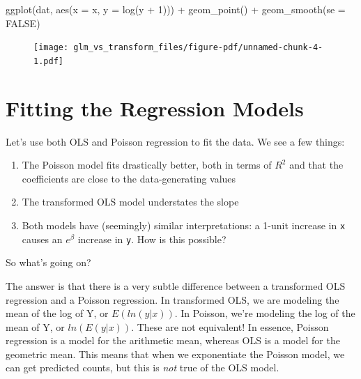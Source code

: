 \documentclass[
  letterpaper,
  DIV=11,
  numbers=noendperiod]{scrreprt}
\newenvironment{Shaded}{\begin{snugshade}}{\end{snugshade}}
\newcommand{\AttributeTok}[1]{\textcolor[rgb]{0.49,0.56,0.16}{#1}}
\newcommand{\ConstantTok}[1]{\textcolor[rgb]{0.53,0.00,0.00}{#1}}
\newcommand{\DecValTok}[1]{\textcolor[rgb]{0.25,0.63,0.44}{#1}}
\newcommand{\FunctionTok}[1]{\textcolor[rgb]{0.02,0.16,0.49}{#1}}
\newcommand{\NormalTok}[1]{\textcolor[rgb]{0.00,0.44,0.13}{#1}}
\newcommand{\SpecialCharTok}[1]{\textcolor[rgb]{0.25,0.44,0.63}{#1}}
\providecommand{\tightlist}{%
  \setlength{\itemsep}{0pt}\setlength{\parskip}{0pt}}\usepackage{longtable,booktabs,array}
\begin{document}
\begin{Shaded}
\begin{Highlighting}[]
\FunctionTok{ggplot}\NormalTok{(dat, }\FunctionTok{aes}\NormalTok{(}\AttributeTok{x =}\NormalTok{ x, }\AttributeTok{y =} \FunctionTok{log}\NormalTok{(y }\SpecialCharTok{+} \DecValTok{1}\NormalTok{))) }\SpecialCharTok{+}
  \FunctionTok{geom\_point}\NormalTok{() }\SpecialCharTok{+}
  \FunctionTok{geom\_smooth}\NormalTok{(}\AttributeTok{se =} \ConstantTok{FALSE}\NormalTok{)}
\end{Highlighting}
\end{Shaded}

\begin{figure}[H]

{\centering \texttt{[image: glm\_vs\_transform\_files/figure-pdf/unnamed-chunk-4-1.pdf]}

}

\end{figure}

\hypertarget{fitting-the-regression-models}{%
\section{Fitting the Regression
Models}\label{fitting-the-regression-models}}

Let's use both OLS and Poisson regression to fit the data. We see a few
things:

\begin{enumerate}
\def\labelenumi{\arabic{enumi}.}
\tightlist
\item
  The Poisson model fits drastically better, both in terms of \(R^2\)
  and that the coefficients are close to the data-generating values
\item
  The transformed OLS model understates the slope
\item
  Both models have (seemingly) similar interpretations: a 1-unit
  increase in \texttt{x} causes an \(e^\beta\) increase in \texttt{y}.
  How is this possible?
\end{enumerate}

So what's going on?

The answer is that there is a very subtle difference between a
transformed OLS regression and a Poisson regression. In transformed OLS,
we are modeling the mean of the log of Y, or \(E(ln(y|x))\). In Poisson,
we're modeling the log of the mean of Y, or \(ln(E(y|x))\). These are
not equivalent! In essence, Poisson regression is a model for the
arithmetic mean, whereas OLS is a model for the geometric mean. This
means that when we exponentiate the Poisson model, we can get predicted
counts, but this is \emph{not} true of the OLS model.
\end{document}
